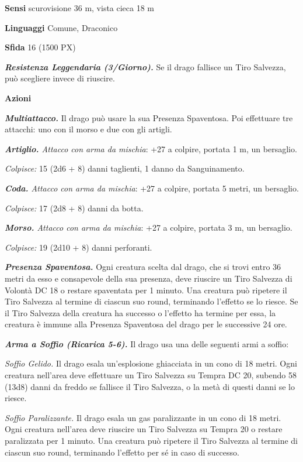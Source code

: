 \begin{multicols}{2}
\textbf{Sensi} scurovisione 36 m, vista cieca 18 m

\textbf{Linguaggi} Comune, Draconico

\textbf{Sfida} 16 (1500 PX)

\textit{\textbf{Resistenza Leggendaria (3/Giorno).}} Se il drago fallisce un Tiro Salvezza, può scegliere invece di riuscire.

\textbf{Azioni}

\textit{\textbf{Multiattacco.}} Il drago può usare la sua Presenza Spaventosa. Poi effettuare tre attacchi: uno con il morso e due con gli artigli.

\textit{\textbf{Artiglio.} Attacco con arma da mischia}: +27 a colpire, portata 1 m, un bersaglio.

\textit{Colpisce:} 15 (2d6 + 8) danni taglienti, 1 danno da Sanguinamento.

\textit{\textbf{Coda.} Attacco con arma da mischia}: +27 a colpire, portata 5 metri, un bersaglio.

\textit{Colpisce:} 17 (2d8 + 8) danni da botta.

\textit{\textbf{Morso.} Attacco con arma da mischia}: +27 a colpire, portata 3 m, un bersaglio.

\textit{Colpisce:} 19 (2d10 + 8) danni perforanti.

\textit{\textbf{Presenza Spaventosa.}} Ogni creatura scelta dal drago, che si trovi entro 36 metri da esso e consapevole della sua presenza, deve riuscire un Tiro Salvezza di Volontà DC 18 o restare spaventata per 1 minuto. Una creatura può ripetere il Tiro Salvezza al termine di ciascun suo round, terminando l'effetto se lo riesce. Se il Tiro Salvezza della creatura ha successo o l'effetto ha termine per essa, la creatura è immune alla Presenza Spaventosa del drago per le successive 24 ore.

\textit{\textbf{Arma a Soffio (Ricarica 5-6).}} Il drago usa una delle seguenti armi a soffio:

\textit{Soffio Gelido.} Il drago esala un'esplosione ghiacciata in un cono di 18 metri. Ogni creatura nell'area deve effettuare un Tiro Salvezza su Tempra DC 20, subendo 58 (13d8) danni da freddo se fallisce il Tiro Salvezza, o la metà di questi danni se lo riesce.

\textit{Soffio Paralizzante.} Il drago esala un gas paralizzante in un cono di 18 metri. Ogni creatura nell'area deve riuscire un Tiro Salvezza su Tempra 20 o restare paralizzata per 1 minuto. Una creatura può ripetere il Tiro Salvezza al termine di ciascun suo round, terminando l'effetto per sé in caso di successo.


\end{multicols}
